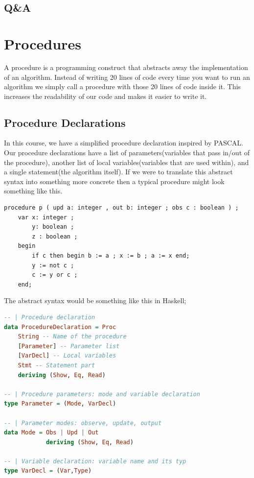\documentclass[tikz, border=5mm]{article}
\begin{document}
        \subsection{Q\&A}

    \section{Procedures}
    A procedure is a programming construct that abstracts away the implementation of an algorithm. Instead of writing 20 lines of code 
    every time you want to run an algorithm we simply call a procedure with those 20 lines of code inside it. This increases the readability 
    of our code and makes it easier to write it. 
    \subsection{Procedure Declarations}
    In this course, we have a simplified procedure declaration inspired by PASCAL. Our procedure declarations have a list of 
    parameters(variables that pass in/out of the procedure), another list of local variables(variables that are used within), 
    and a single statement(the algorithm itself).
    If we were to translate this abstract syntax into something more concrete then a typical procedure might look something like this.
    \begin{lstlisting}
procedure p ( upd a: integer , out b: integer ; obs c : boolean ) ;
    var x: integer ;
        y: boolean ;
        z : boolean ;
    begin
        if c then begin b := a ; x := b ; a := x end;
        y := not c ;
        c := y or c ;
    end;
    \end{lstlisting}
    The abstract syntax would be something like this in Haskell;
    \begin{lstlisting}[language=Haskell]
-- | Procedure declaration
data ProcedureDeclaration = Proc
    String -- Name of the procedure
    [Parameter] -- Parameter list
    [VarDecl] -- Local variables
    Stmt -- Statement part
    deriving (Show, Eq, Read)

-- | Procedure parameters: mode and variable declaration
type Parameter = (Mode, VarDecl)

-- | Parameter modes: observe, update, output
data Mode = Obs | Upd | Out 
            deriving (Show, Eq, Read)

-- | Variable declaration: variable name and its typ
type VarDecl = (Var,Type)

    \end{lstlisting}
\end{document}
